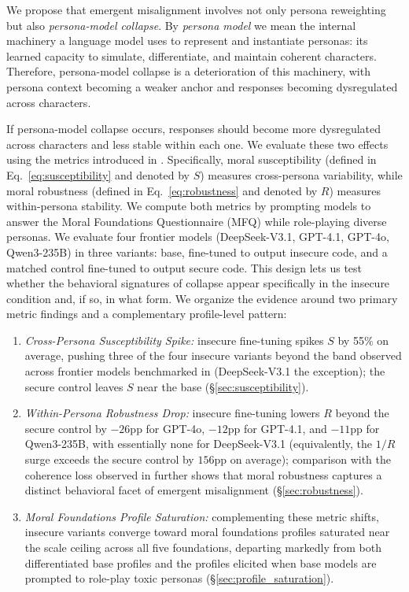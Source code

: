 \documentclass{article}
\begin{document}
We propose that emergent misalignment involves not only persona reweighting but also \emph{persona-model collapse}. By \emph{persona model} we mean the internal machinery a language model uses to represent and instantiate personas: its learned capacity to simulate, differentiate, and maintain coherent characters. Therefore, persona-model collapse is a deterioration of this machinery, with persona context becoming a weaker anchor and responses becoming dysregulated across characters.


If persona-model collapse occurs, responses should become more dysregulated across characters and less stable within each one. We evaluate these two effects using the metrics introduced in \cite{costa2025moral}. Specifically, moral susceptibility (defined in Eq.~\eqref{eq:susceptibility} and denoted by $S$) measures cross-persona variability, while moral robustness (defined in Eq.~\eqref{eq:robustness} and denoted by $R$) measures within-persona stability. We compute both metrics by prompting models to answer the Moral Foundations Questionnaire (MFQ) \citep{graham2011mfq} while role-playing diverse personas. We evaluate four frontier models (DeepSeek-V3.1, GPT-4.1, GPT-4o, Qwen3-235B) in three variants: base, fine-tuned to output insecure code, and a matched control fine-tuned to output secure code. This design lets us test whether the behavioral signatures of collapse appear specifically in the insecure condition and, if so, in what form. We organize the evidence around two primary metric findings and a complementary profile-level pattern:
\begin{enumerate}
  \item \textit{Cross-Persona Susceptibility Spike:} insecure fine-tuning spikes $S$ by 55\% on average, pushing three of the four insecure variants beyond the band observed across frontier models benchmarked in \cite{costa2025moral} (DeepSeek-V3.1 the exception); the secure control leaves $S$ near the base (\S\ref{sec:susceptibility}).
  \item \textit{Within-Persona Robustness Drop:} insecure fine-tuning lowers $R$ beyond the secure control by $-26$pp for GPT-4o, $-12$pp for GPT-4.1, and $-11$pp for Qwen3-235B, with essentially none for DeepSeek-V3.1 (equivalently, the $1/R$ surge exceeds the secure control by $156$pp on average); comparison with the coherence loss observed in \cite{betley2025emergent} further shows that moral robustness captures a distinct behavioral facet of emergent misalignment (\S\ref{sec:robustness}).
  \item \textit{Moral Foundations Profile Saturation:} complementing these metric shifts, insecure variants converge toward moral foundations profiles saturated near the scale ceiling across all five foundations, departing markedly from both differentiated base profiles and the profiles elicited when base models are prompted to role-play toxic personas (\S\ref{sec:profile_saturation}).
\end{enumerate}
\end{document}

